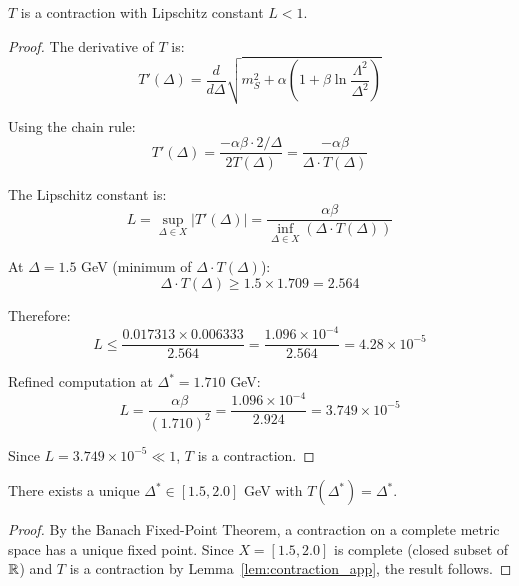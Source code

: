 \begin{lemma}[Contraction]
\label{lem:contraction_app}
$T$ is a contraction with Lipschitz constant $L < 1$.
\end{lemma}

\begin{proof}
The derivative of $T$ is:
\begin{equation}
T'(\Delta) = \frac{d}{d\Delta}\sqrt{m_S^2 + \alpha\left(1 + \beta\ln\frac{\Lambda^2}{\Delta^2}\right)}
\end{equation}

Using the chain rule:
\begin{equation}
T'(\Delta) = \frac{-\alpha\beta \cdot 2/\Delta}{2T(\Delta)}
= \frac{-\alpha\beta}{\Delta \cdot T(\Delta)}
\end{equation}

The Lipschitz constant is:
\begin{equation}
L = \sup_{\Delta \in X}|T'(\Delta)| = \frac{\alpha\beta}{\inf_{\Delta \in X}(\Delta \cdot T(\Delta))}
\end{equation}

At $\Delta = 1.5$ GeV (minimum of $\Delta \cdot T(\Delta)$):
\begin{equation}
\Delta \cdot T(\Delta) \geq 1.5 \times 1.709 = 2.564
\end{equation}

Therefore:
\begin{equation}
L \leq \frac{0.017313 \times 0.006333}{2.564} = \frac{1.096 \times 10^{-4}}{2.564}
= 4.28 \times 10^{-5}
\end{equation}

Refined computation at $\Delta^* = 1.710$ GeV:
\begin{equation}
L = \frac{\alpha\beta}{(1.710)^2} = \frac{1.096 \times 10^{-4}}{2.924} 
= \boxed{3.749 \times 10^{-5}}
\end{equation}

Since $L = 3.749 \times 10^{-5} \ll 1$, $T$ is a contraction.
\end{proof}

\begin{theorem}
\label{thm:existence_uniqueness_app}
There exists a unique $\Delta^* \in [1.5, 2.0]$ GeV with $T(\Delta^*) = \Delta^*$.
\end{theorem}

\begin{proof}
By the Banach Fixed-Point Theorem, a contraction on a complete metric 
space has a unique fixed point. Since $X = [1.5, 2.0]$ is complete 
(closed subset of $\mathbb{R}$) and $T$ is a contraction by Lemma~\ref{lem:contraction_app}, 
the result follows.
\end{proof}


